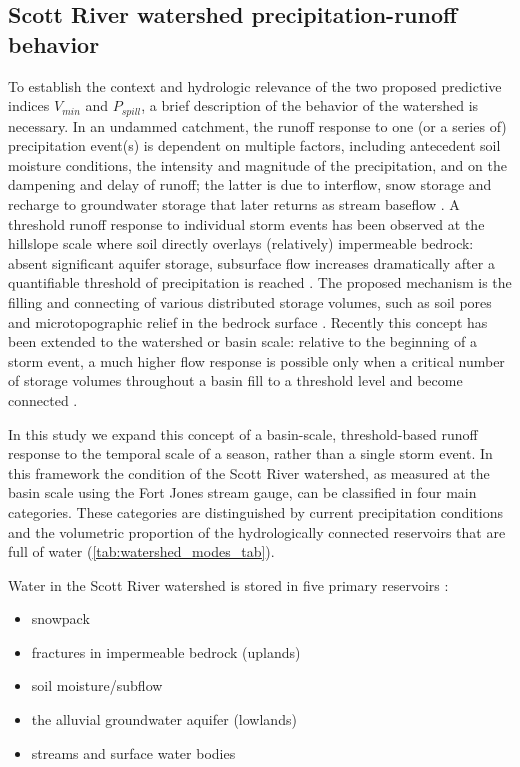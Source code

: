 \documentclass[hess, manuscript]{copernicus}
\providecommand{\tightlist}{%
  \setlength{\itemsep}{0pt}\setlength{\parskip}{0pt}}
\begin{document}
\subsection{Scott River watershed precipitation-runoff behavior}

To establish the context and hydrologic relevance of the two proposed
predictive indices \(V_{min}\) and \(P_{spill}\), a brief description of
the behavior of the watershed is necessary. In an undammed catchment,
the runoff response to one (or a series of) precipitation event(s) is
dependent on multiple factors, including antecedent soil moisture
conditions, the intensity and magnitude of the precipitation, and on the
dampening and delay of runoff; the latter is due to interflow, snow
storage and recharge to groundwater storage that later returns as stream
baseflow \citep{Tarboton2003}. A threshold runoff response to individual
storm events has been observed at the hillslope scale where soil
directly overlays (relatively) impermeable bedrock: absent significant
aquifer storage, subsurface flow increases dramatically after a
quantifiable threshold of precipitation is reached
\citep{Tromp-VanMeerveld2006}. The proposed mechanism is the filling and
connecting of various distributed storage volumes, such as soil pores
and microtopographic relief in the bedrock surface
\citep{Tromp-VanMeerveld2006}. Recently this concept has been extended
to the watershed or basin scale: relative to the beginning of a storm
event, a much higher flow response is possible only when a critical
number of storage volumes throughout a basin fill to a threshold level
and become connected \citep{McDonnell2021}.

In this study we expand this concept of a basin-scale, threshold-based
runoff response to the temporal scale of a season, rather than a single
storm event. In this framework the condition of the Scott River
watershed, as measured at the basin scale using the Fort Jones stream
gauge, can be classified in four main categories. These categories are
distinguished by current precipitation conditions and the volumetric
proportion of the hydrologically connected reservoirs that are full of
water (\autoref{tab:watershed_modes_tab}).

Water in the Scott River watershed is stored in five primary reservoirs
\citep{Harter2008}:

\begin{itemize}
\tightlist
\item
  snowpack
\item
  fractures in impermeable bedrock (uplands)
\item
  soil moisture/subflow
\item
  the alluvial groundwater aquifer (lowlands)
\item
  streams and surface water bodies
\end{itemize}
\end{document}
